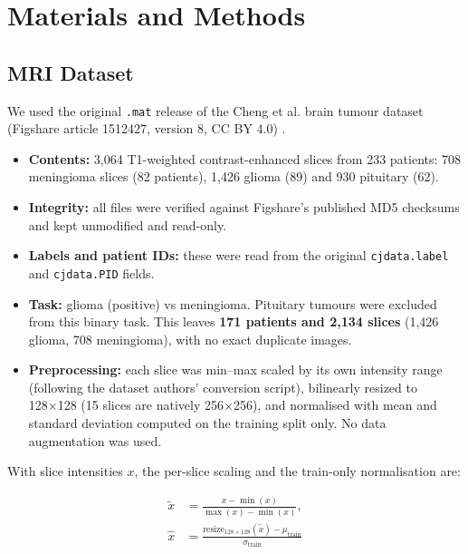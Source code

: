 \section{Materials and Methods}
\label{sec:03_methods}

\subsection{MRI Dataset}

We used the original \texttt{.mat} release of the Cheng et al. brain tumour dataset (Figshare article 1512427, version 8, CC BY 4.0) \cite{cheng2024dataset}.

\begin{itemize}
\item \textbf{Contents:} 3,064 T1-weighted contrast-enhanced slices from 233 patients: 708 meningioma slices (82 patients), 1,426 glioma (89) and 930 pituitary (62).
\item \textbf{Integrity:} all files were verified against Figshare's published MD5 checksums and kept unmodified and read-only.
\item \textbf{Labels and patient IDs:} these were read from the original \texttt{cjdata.label} and \texttt{cjdata.PID} fields.
\item \textbf{Task:} glioma (positive) vs meningioma. Pituitary tumours were excluded from this binary task. This leaves \textbf{171 patients and 2,134 slices} (1,426 glioma, 708 meningioma), with no exact duplicate images.
\item \textbf{Preprocessing:} each slice was min–max scaled by its own intensity range (following the dataset authors' conversion script), bilinearly resized to 128×128 (15 slices are natively 256×256), and normalised with mean and standard deviation computed on the training split only. No data augmentation was used.
\end{itemize}

With slice intensities $x$, the per-slice scaling and the train-only normalisation are:

\begin{equation}
\begin{aligned}
\tilde{x} &= \frac{x - \min(x)}{\max(x) - \min(x)}, \\
\hat{x} &= \frac{\mathrm{resize}_{128\times128}(\tilde{x}) - \mu_{\mathrm{train}}}{\sigma_{\mathrm{train}}}
\end{aligned}
\label{eq:1}
\end{equation}

